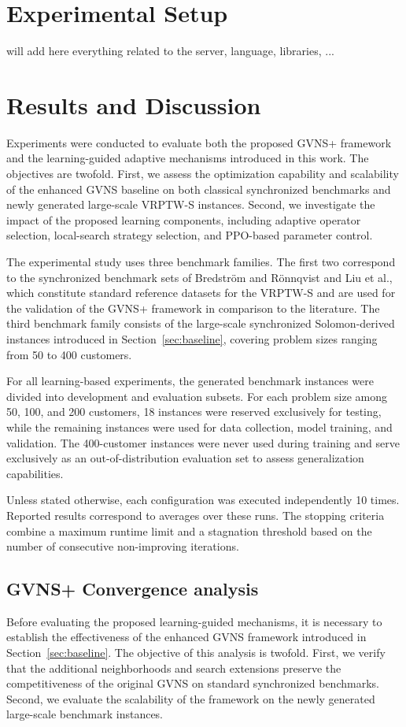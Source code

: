 \section{Experimental Setup}
\label{sec:setup}
will add here everything related to the server, language, libraries, ...

\section{Results and Discussion}
\label{sec:results}
Experiments were conducted to evaluate both the proposed GVNS+ framework and the learning-guided adaptive mechanisms introduced in this work. The objectives are twofold. First, we assess the optimization capability and scalability of the enhanced GVNS baseline on both classical synchronized benchmarks and newly generated large-scale VRPTW-S instances. Second, we investigate the impact of the proposed learning components, including adaptive operator selection, local-search strategy selection, and PPO-based parameter control.

The experimental study uses three benchmark families. The first two correspond to the synchronized benchmark sets of Bredström and Rönnqvist and Liu et al., which constitute standard reference datasets for the VRPTW-S and are used for the validation of the GVNS+ framework in comparison to the literature. The third benchmark family consists of the large-scale synchronized Solomon-derived instances introduced in Section~\ref{sec:baseline}, covering problem sizes ranging from 50 to 400 customers.

For all learning-based experiments, the generated benchmark instances were divided into development and evaluation subsets. For each problem size among 50, 100, and 200 customers, 18 instances were reserved exclusively for testing, while the remaining instances were used for data collection, model training, and validation. The 400-customer instances were never used during training and serve exclusively as an out-of-distribution evaluation set to assess generalization capabilities.

Unless stated otherwise, each configuration was executed independently 10 times. Reported results correspond to averages over these runs. The stopping criteria combine a maximum runtime limit and a stagnation threshold based on the number of consecutive non-improving iterations.

\subsection{GVNS+ Convergence analysis}
\label{sec:gvns_plus}
Before evaluating the proposed learning-guided mechanisms, it is necessary to establish the effectiveness of the enhanced GVNS framework introduced in Section~\ref{sec:baseline}. The objective of this analysis is twofold. First, we verify that the additional neighborhoods and search extensions preserve the competitiveness of the original GVNS on standard synchronized benchmarks. Second, we evaluate the scalability of the framework on the newly generated large-scale benchmark instances.

